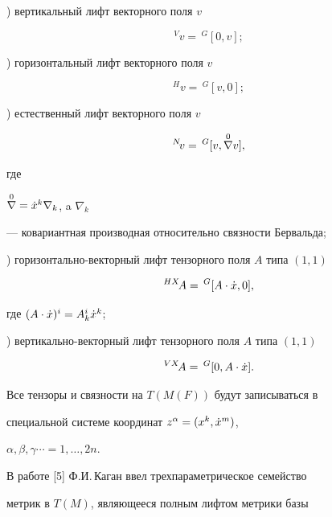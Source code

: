 ) вертикальный лифт векторного поля $v$


$$


{}^V\! v =\,{}^G[0, v];


$$


) горизонтальный лифт векторного поля $v$


$$


{}^{H}\! v =\,{}^G[v, 0];


$$


) естественный лифт векторного поля $v$


$$


{}^N\! v =\,{}^{G}[v,\up{\nabla}{0} v],


$$


\noindent где


$\overset{0}{\nabla}{} = \Dot x^{k}\nabla_{k}$, a $\nabla_{k}$


--- ковариантная производная относительно связности Бервальда;





) горизонтально-векторный лифт тензорного поля $A$ типа $(1,1)$


$$


{}^{HX}\! A =\,{}^G[A\cdot \xt,0],


$$


где $(A\cdot \Dot x)^{i} = A^{i}_{k}\Dot x^{k}$;





) вертикально-векторный лифт тензорного поля $A$ типа $(1,1)$


$$


{}^{VX}\! A =\,{}^{G}[0, A\cdot \xt].


$$


Все тензоры и связности на $T(M(F))$ будут записываться в


специальной системе координат $z^{\alpha} = (x^{k}, \Dot x^{m})$,


$\alpha ,\beta ,\gamma\dotsb = 1,\dotsc,2n$.


\par


В работе [5] Ф.И.\,Каган ввел трехпараметрическое семейство


метрик в $T(M)$, являющееся полным лифтом метрики базы


